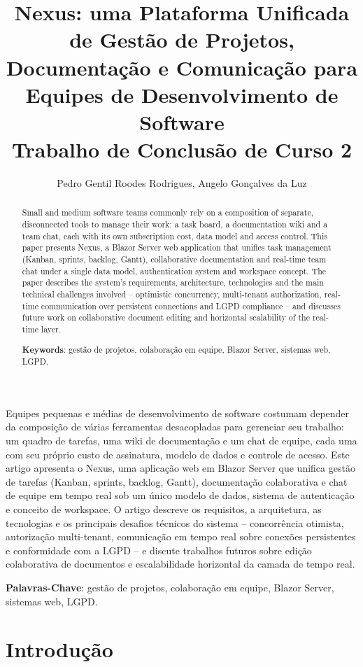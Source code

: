 \documentclass[12pt]{article}
\title{Nexus: uma Plataforma Unificada de Gestão de Projetos, Documentação e Comunicação para Equipes de Desenvolvimento de Software\\ Trabalho de Conclusão de Curso 2}
\author{Pedro Gentil Roodes Rodrigues\inst{1}, Angelo Gonçalves da Luz\inst{1}}
\begin{document}
\maketitle

\begin{abstract}
Small and medium software teams commonly rely on a composition of separate, disconnected tools to manage their work: a task board, a documentation wiki and a team chat, each with its own subscription cost, data model and access control. This paper presents Nexus, a Blazor Server web application that unifies task management (Kanban, sprints, backlog, Gantt), collaborative documentation and real-time team chat under a single data model, authentication system and workspace concept. The paper describes the system's requirements, architecture, technologies and the main technical challenges involved -- optimistic concurrency, multi-tenant authorization, real-time communication over persistent connections and LGPD compliance -- and discusses future work on collaborative document editing and horizontal scalability of the real-time layer.

  \textbf{Keywords}: gestão de projetos, colaboração em equipe, Blazor Server, sistemas web, LGPD.
\end{abstract}

\begin{resumo}
Equipes pequenas e médias de desenvolvimento de software costumam depender da composição de várias ferramentas desacopladas para gerenciar seu trabalho: um quadro de tarefas, uma wiki de documentação e um chat de equipe, cada uma com seu próprio custo de assinatura, modelo de dados e controle de acesso. Este artigo apresenta o Nexus, uma aplicação web em Blazor Server que unifica gestão de tarefas (Kanban, sprints, backlog, Gantt), documentação colaborativa e chat de equipe em tempo real sob um único modelo de dados, sistema de autenticação e conceito de workspace. O artigo descreve os requisitos, a arquitetura, as tecnologias e os principais desafios técnicos do sistema -- concorrência otimista, autorização multi-tenant, comunicação em tempo real sobre conexões persistentes e conformidade com a LGPD -- e discute trabalhos futuros sobre edição colaborativa de documentos e escalabilidade horizontal da camada de tempo real.

  \textbf{Palavras-Chave}: gestão de projetos, colaboração em equipe, Blazor Server, sistemas web, LGPD.
\end{resumo}

\section{Introdução}
\end{document}
